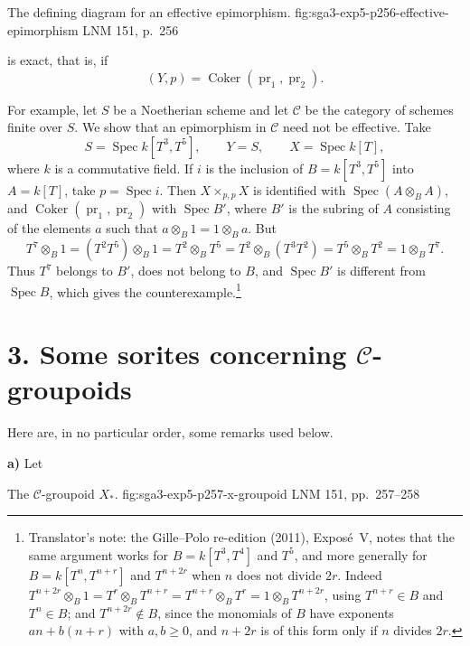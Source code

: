   {The defining diagram for an effective epimorphism.}
  {fig:sga3-exp5-p256-effective-epimorphism}
  {LNM 151, p.~256}

\noindent is exact, that is, if
\[
  (Y,p)=\operatorname{Coker}(\operatorname{pr}_1,\operatorname{pr}_2).
\]

For example, let \(S\) be a Noetherian scheme and let \(\mathscr C\) be
the category of schemes finite over \(S\). We show that an epimorphism in
\(\mathscr C\) need not be effective. Take
\[
  S=\operatorname{Spec}k[T^3,T^5],\qquad
  Y=S,\qquad X=\operatorname{Spec}k[T],
\]
where \(k\) is a commutative field. If \(i\) is the inclusion of
\(B=k[T^3,T^5]\) into \(A=k[T]\), take \(p=\operatorname{Spec}i\). Then
\(X\times_{p,p}X\) is identified with \(\operatorname{Spec}(A\otimes_B A)\),
and \(\operatorname{Coker}(\operatorname{pr}_1,\operatorname{pr}_2)\)
with \(\operatorname{Spec}B'\), where \(B'\) is the subring of \(A\)
consisting of the elements \(a\) such that
\(a\otimes_B1=1\otimes_Ba\). But
\[
  T^7\otimes_B1
  =(T^2T^5)\otimes_B1
  =T^2\otimes_BT^5
  =T^2\otimes_B(T^3T^2)
  =T^5\otimes_BT^2
  =1\otimes_BT^7.
\]
Thus \(T^7\) belongs to \(B'\), does not belong to \(B\), and
\(\operatorname{Spec}B'\) is different from \(\operatorname{Spec}B\),
which gives the counterexample.\footnote{Translator's note: the Gille--Polo re-edition (2011), Exposé~V, notes
that the same argument works for \(B=k[T^3,T^4]\) and \(T^5\), and more
generally for \(B=k[T^n,T^{n+r}]\) and \(T^{n+2r}\) when \(n\) does not divide
\(2r\). Indeed
\(T^{n+2r}\otimes_B1=T^r\otimes_BT^{n+r}=T^{n+r}\otimes_BT^r=1\otimes_BT^{n+2r}\),
using \(T^{n+r}\in B\) and \(T^n\in B\); and \(T^{n+2r}\notin B\), since the
monomials of \(B\) have exponents \(an+b(n+r)\) with \(a,b\geq0\), and
\(n+2r\) is of this form only if \(n\) divides \(2r\).}

\section*{3. Some sorites concerning \(\mathscr C\)-groupoids}
\label{sec:sga3-V-3}

Here are, in no particular order, some remarks used below.

\medskip
{}\label{par:sga3-V-3-a}%
\noindent\textbf{a)} Let

  {The \(\mathscr C\)-groupoid \(X_\ast\).}
  {fig:sga3-exp5-p257-x-groupoid}
  {LNM 151, pp.~257--258}

